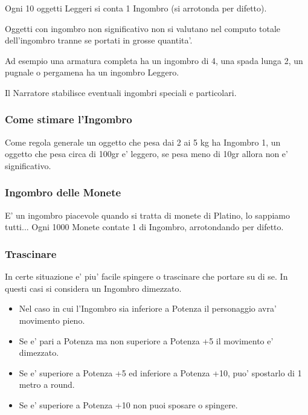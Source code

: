 \documentclass[a4paper,11pt,twoside,openany]{book}
\begin{document}
{		Ogni 10 oggetti Leggeri si conta 1 Ingombro (si arrotonda per difetto).
		
		
		Oggetti con ingombro non significativo non si valutano nel computo totale dell'ingombro tranne se portati in grosse quantita'. 
		
		Ad esempio una armatura completa ha un ingombro di 4, una spada lunga 2, un pugnale o pergamena ha un ingombro Leggero.
		
		Il Narratore stabilisce eventuali ingombri speciali e particolari.
		
		\subsubsection{Come stimare l'Ingombro}
		
		Come regola generale un oggetto che pesa dai 2 ai 5 kg ha Ingombro 1, un oggetto che pesa circa di 100gr e' leggero, se pesa meno di 10gr allora non e' significativo.
		
		\subsubsection{Ingombro delle Monete}
		
		E' un ingombro piacevole quando si tratta di monete di Platino, lo sappiamo tutti...
		Ogni 1000 Monete contate 1 di Ingombro, arrotondando per difetto.
		
		
		\subsubsection{Trascinare}
		
		In certe situazione e' piu' facile spingere o trascinare che portare su di se.
		In questi casi si considera un Ingombro dimezzato.
		
		\begin{itemize}
			\item Nel caso in cui l'Ingombro sia inferiore a Potenza il personaggio avra' movimento pieno.
			
			\item Se e' pari a Potenza ma non superiore a Potenza +5 il movimento e' dimezzato.
			
			\item Se e' superiore a Potenza +5 ed inferiore a Potenza +10, puo' spostarlo di 1 metro a round.
			
			\item Se e' superiore a Potenza +10 non puoi sposare o spingere.
		\end{itemize}
		
}
\end{document}
